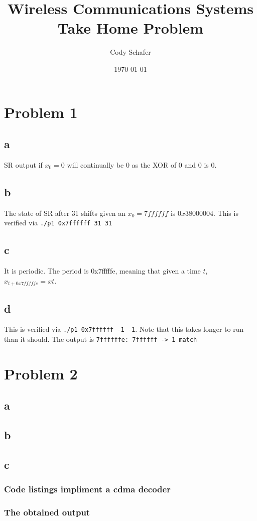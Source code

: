 \documentclass{article}
\title{Wireless Communications Systems \\
	Take Home Problem}
\author{Cody Schafer}
\date{\today}
\begin{document}
	\maketitle
\lstset{breaklines=true}
\section{Problem 1}

\subsection{a}
SR output if $x_0 = 0$ will continually be 0 as the XOR of 0 and 0 is 0.

\subsection{b}
The state of SR after 31 shifts given an $x_0 = 7ffffff$ is $0x38000004$. This is verified via \texttt{./p1 0x7ffffff 31 31}

\subsection{c}
It is periodic. The period is 0x7fffffe, meaning that given a time $t$, $x_{t+0x7fffffe} = x{t}$.

\subsection{d}
This is verified via \texttt{./p1 0x7ffffff -1 -1}. Note that this takes longer to run than it should.
The output is \texttt{7ffffffe: 7ffffff -> 1
	match
}



\section{Problem 2}

\subsection{a}

\subsection{b}

\subsection{c}

\subsubsection{Code listings impliment a cdma decoder}




\subsubsection{The obtained output}


\end{document}
